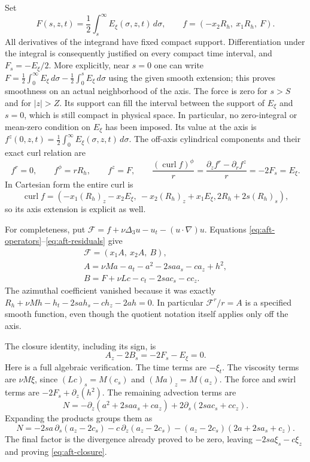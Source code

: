 Set
\begin{equation}\label{eq:aft-force}
 F(s,z,t)=\frac12\int_s^\infty E_\xi(\sigma,z,t)\,d\sigma,
 \qquad f=(-x_2R_h,\ x_1R_h,\ F).
\end{equation}
All derivatives of the integrand have fixed compact support.  Differentiation
under the integral is consequently justified on every compact time interval,
and \(F_s=-E_\xi/2\).  More explicitly, near \(s=0\) one can write
\(F=\tfrac12\int_0^\infty E_\xi\,d\sigma
-\tfrac12\int_0^s E_\xi\,d\sigma\) using the given smooth extension;
this proves smoothness on an actual neighborhood of the axis.
The force is zero for \(s>S\) and for \(|z|>Z\).  Its support can fill
the interval between the support of \(E_\xi\) and \(s=0\), which is
still compact in physical space.  In particular, no zero-integral or
mean-zero condition on \(E_\xi\) has been imposed.  Its value at the axis is
\(f^z(0,z,t)=\tfrac12\int_0^\infty E_\xi(\sigma,z,t)\,d\sigma\).
The off-axis cylindrical components and their exact curl relation are
\begin{equation}\label{eq:aft-force-curl}
 f^r=0,\qquad f^\phi=rR_h,\qquad f^z=F,\qquad
 \frac{(\operatorname{curl}f)^\phi}{r}
 =\frac{\partial_z f^r-\partial_r f^z}{r}=-2F_s=E_\xi.
\end{equation}
In Cartesian form the entire curl is
\[
 \operatorname{curl}f=
 (-x_1(R_h)_z-x_2E_\xi,\ -x_2(R_h)_z+x_1E_\xi,
  2R_h+2s(R_h)_s),
\]
so its axis extension is explicit as well.

For completeness, put \(\mathcal F=f+\nu\Delta_3u-u_t-(u\cdot\nabla)u\).
Equations \eqref{eq:aft-operators}--\eqref{eq:aft-residuals} give
\begin{equation}\label{eq:aft-pressure-coefficients}
 \begin{gathered}
 \mathcal F=(x_1A,\ x_2A,\ B),\\
 A=\nu Ma-a_t-a^2-2s a a_s-c a_z+h^2,\\
 B=F+\nu Lc-c_t-2s a c_s-c c_z.
 \end{gathered}
\end{equation}
The azimuthal coefficient vanished because it was exactly
\(R_h+\nu Mh-h_t-2s a h_s-c h_z-2ah=0\).
In particular \(\mathcal F^r/r=A\) is a specified smooth function, even
though the quotient notation itself applies only off the axis.

The closure identity, including its sign, is
\begin{equation}\label{eq:aft-closure}
 A_z-2B_s=-2F_s-E_\xi=0.
\end{equation}
Here is a full algebraic verification.  The time terms are \(-\xi_t\).
The viscosity terms are \(\nu M\xi\), since
\((Lc)_s=M(c_s)\) and \((Ma)_z=M(a_z)\).  The force and swirl terms are
\(-2F_s+\partial_z(h^2)\).  The remaining advection terms are
\[
 N=-\partial_z(a^2+2s a a_s+c a_z)
       +2\partial_s(2s a c_s+c c_z).
\]
Expanding the products groups them as
\[
 N=-2s a\,\partial_s(a_z-2c_s)
     -c\,\partial_z(a_z-2c_s)
     -(a_z-2c_s)(2a+2s a_s+c_z).
\]
The final factor is the divergence already proved to be zero, leaving
\(-2s a\xi_s-c\xi_z\) and proving \eqref{eq:aft-closure}.

